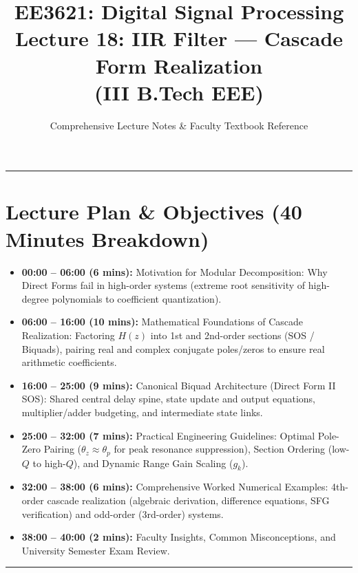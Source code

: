 \documentclass[11pt,a4paper]{article}
\title{\textbf{EE3621: Digital Signal Processing} \\ \Large Lecture 18: IIR Filter — Cascade Form Realization \\ \large (III B.Tech EEE)}
\author{Comprehensive Lecture Notes \& Faculty Textbook Reference}
\date{}
\begin{document}
\maketitle

\noindent\rule{\textwidth}{0.5pt}

\section*{Lecture Plan \& Objectives (40 Minutes Breakdown)}
\begin{itemize}
    \item \textbf{00:00 -- 06:00 (6 mins):} Motivation for Modular Decomposition: Why Direct Forms fail in high-order systems (extreme root sensitivity of high-degree polynomials to coefficient quantization).
    \item \textbf{06:00 -- 16:00 (10 mins):} Mathematical Foundations of Cascade Realization: Factoring $H(z)$ into 1st and 2nd-order sections (SOS / Biquads), pairing real and complex conjugate poles/zeros to ensure real arithmetic coefficients.
    \item \textbf{16:00 -- 25:00 (9 mins):} Canonical Biquad Architecture (Direct Form II SOS): Shared central delay spine, state update and output equations, multiplier/adder budgeting, and intermediate state links.
    \item \textbf{25:00 -- 32:00 (7 mins):} Practical Engineering Guidelines: Optimal Pole-Zero Pairing ($\theta_z \approx \theta_p$ for peak resonance suppression), Section Ordering (low-$Q$ to high-$Q$), and Dynamic Range Gain Scaling ($g_k$).
    \item \textbf{32:00 -- 38:00 (6 mins):} Comprehensive Worked Numerical Examples: 4th-order cascade realization (algebraic derivation, difference equations, SFG verification) and odd-order (3rd-order) systems.
    \item \textbf{38:00 -- 40:00 (2 mins):} Faculty Insights, Common Misconceptions, and University Semester Exam Review.
\end{itemize}

\noindent\rule{\textwidth}{0.5pt}
\end{document}
